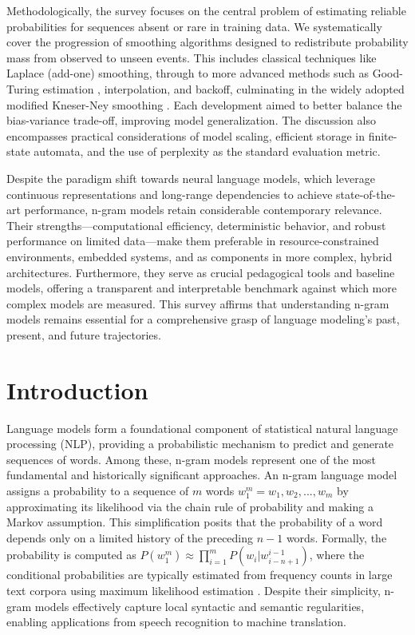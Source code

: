 \documentclass[10pt,a4paper]{article}
\begin{document}
Methodologically, the survey focuses on the central problem of estimating reliable probabilities for sequences absent or rare in training data. We systematically cover the progression of smoothing algorithms designed to redistribute probability mass from observed to unseen events. This includes classical techniques like Laplace (add-one) smoothing, through to more advanced methods such as Good-Turing estimation \cite{anonndgoodturing1953}, interpolation, and backoff, culminating in the widely adopted modified Kneser-Ney smoothing \cite{anonndkneserney1995}. Each development aimed to better balance the bias-variance trade-off, improving model generalization. The discussion also encompasses practical considerations of model scaling, efficient storage in finite-state automata, and the use of perplexity as the standard evaluation metric.

Despite the paradigm shift towards neural language models, which leverage continuous representations and long-range dependencies to achieve state-of-the-art performance, n-gram models retain considerable contemporary relevance. Their strengths—computational efficiency, deterministic behavior, and robust performance on limited data—make them preferable in resource-constrained environments, embedded systems, and as components in more complex, hybrid architectures. Furthermore, they serve as crucial pedagogical tools and baseline models, offering a transparent and interpretable benchmark against which more complex models are measured. This survey affirms that understanding n-gram models remains essential for a comprehensive grasp of language modeling's past, present, and future trajectories.


\section{ Introduction }
Language models form a foundational component of statistical natural language processing (NLP), providing a probabilistic mechanism to predict and generate sequences of words. Among these, n-gram models represent one of the most fundamental and historically significant approaches. An n-gram language model assigns a probability to a sequence of \( m \) words \( w_1^m = w_1, w_2, ..., w_m \) by approximating its likelihood via the chain rule of probability and making a Markov assumption. This simplification posits that the probability of a word depends only on a limited history of the preceding \( n-1 \) words. Formally, the probability is computed as \( P(w_1^m) \approx \prod_{i=1}^{m} P(w_i | w_{i-n+1}^{i-1}) \), where the conditional probabilities are typically estimated from frequency counts in large text corpora using maximum likelihood estimation \cite{anonndjelinek1990}. Despite their simplicity, n-gram models effectively capture local syntactic and semantic regularities, enabling applications from speech recognition to machine translation.
\end{document}
